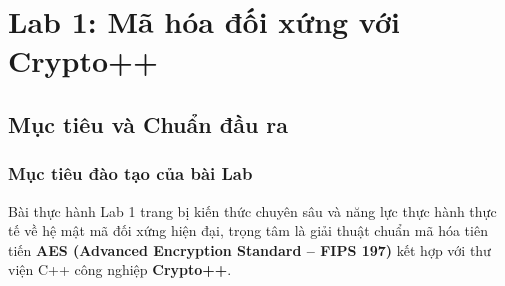 \documentclass[12pt, a4paper]{report}
\begin{document}
\tableofcontents
\clearpage
\listoffigures
\clearpage
\listoftables
\clearpage


\chapter{Lab 1: Mã hóa đối xứng với Crypto++}
\label{chap:lab1}

\section{Mục tiêu và Chuẩn đầu ra}
\label{sec:objectives}

\subsection{Mục tiêu đào tạo của bài Lab}
Bài thực hành Lab 1 trang bị kiến thức chuyên sâu và năng lực thực hành thực tế về hệ mật mã đối xứng hiện đại, trọng tâm là giải thuật chuẩn mã hóa tiên tiến \textbf{AES (Advanced Encryption Standard -- FIPS 197)} kết hợp với thư viện C++ công nghiệp \textbf{Crypto++}.
\end{document}
